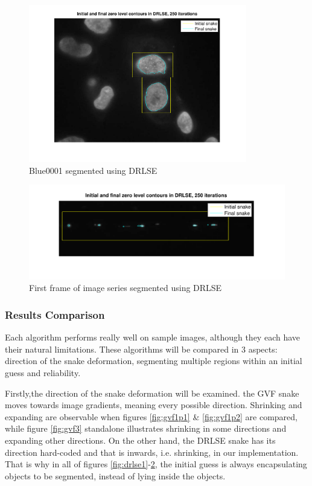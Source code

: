 \documentclass{article}
\begin{document}
\begin{figure}
\centering
\includegraphics[width=0.85\textwidth]{figures/drlse2.pdf}
\caption{Blue0001 segmented using DRLSE}
\label{fig:drlse2}
\end{figure}


\begin{figure}
\centering
\includegraphics[width=1\textwidth]{figures/drlse3.pdf}
\caption{First frame of image series segmented using DRLSE}
\label{fig:drlse3}
\end{figure}



\subsubsection*{Results Comparison}
Each algorithm performs really well on sample images, although they each have their natural limitations. These algorithms will be compared in 3 aspects: direction of the snake deformation, segmenting multiple regions within an initial guess and reliability.

Firstly,the direction of the snake deformation will be examined. the GVF snake moves towards image gradients, meaning every possible direction. Shrinking and expanding are observable when figures \ref{fig:gvf1p1} \& \ref{fig:gvf1p2} are compared, while figure \ref{fig:gvf3} standalone illustrates shrinking in some directions and expanding other directions. On the other hand, the DRLSE snake has its direction hard-coded and that is inwards,  i.e. shrinking, in our implementation. That is why in all of figures \ref{fig:drlse1}-\ref{fig:drlse3}, the initial guess is always encapsulating objects to be segmented, instead of lying inside the objects.
\end{document}
